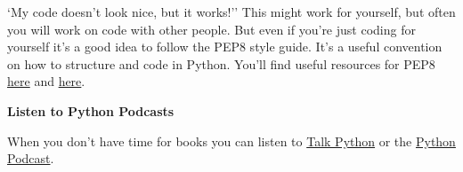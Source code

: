 \documentclass[
  11pt,
]{article}
\newenvironment{tipsp}[1]
  {
  \begin{itemize}
  \footnotesize
  \renewcommand{\labelitemi}{
    \raisebox{-.7\height}[0pt][0pt]{
      {\setkeys{Gin}{width=3em,keepaspectratio}
        \texttt{[image: images/\#1.png]}}
    }
  }
  \setlength{\fboxsep}{1em}
  \begin{pbox}
  \item
  }
  {
  \end{pbox}
  \end{itemize}
  }
\begin{document}
\begin{tipsp}
``My code doesn't look nice, but it works!''
This might work for yourself, but often you will work on code with other people. But even if you're just coding for yourself it's a good idea to follow the PEP8 style guide. It's a useful convention on how to structure and code in Python. You'll find useful resources for PEP8 \href{https://realpython.com/python-pep8/}{here} and \href{https://www.python.org/dev/peps/pep-0020/\#id2}{here}.

\textbf{Listen to Python Podcasts}

When you don't have time for books you can listen to \href{https://talkpython.fm/home}{Talk Python} or the \href{https://www.pythonpodcast.com}{Python Podcast}.

\end{tipsp}

  
\end{document}
